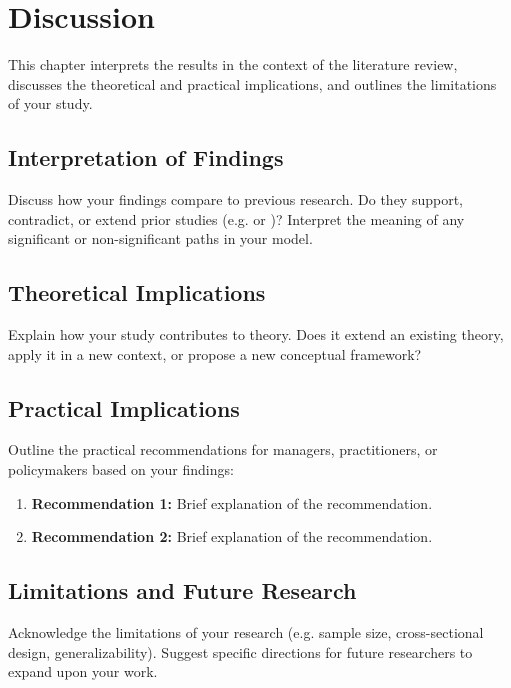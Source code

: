 
\section{Discussion}

This chapter interprets the results in the context of the literature review, discusses the theoretical and practical implications, and outlines the limitations of your study.

\subsection{Interpretation of Findings}
Discuss how your findings compare to previous research. Do they support, contradict, or extend prior studies (e.g. \textcite{Duchek2020} or \textcite{Denyer2017})? Interpret the meaning of any significant or non-significant paths in your model.

\subsection{Theoretical Implications}
Explain how your study contributes to theory. Does it extend an existing theory, apply it in a new context, or propose a new conceptual framework?

\subsection{Practical Implications}
Outline the practical recommendations for managers, practitioners, or policymakers based on your findings:
\begin{enumerate}
    \item \textbf{Recommendation 1:} Brief explanation of the recommendation.
    \item \textbf{Recommendation 2:} Brief explanation of the recommendation.
\end{enumerate}

\subsection{Limitations and Future Research}
Acknowledge the limitations of your research (e.g. sample size, cross-sectional design, generalizability). Suggest specific directions for future researchers to expand upon your work.
